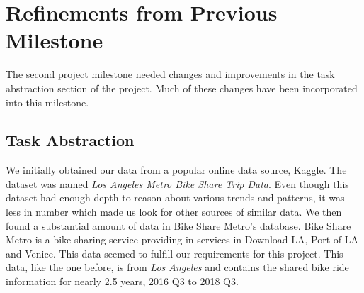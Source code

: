 \section{Refinements from Previous Milestone} 
\label{sec:research}

The second project milestone needed changes and improvements in the task abstraction section of the project. Much of these changes have been incorporated into this milestone. 

\subsection{Task Abstraction}
\label{sec:task abstraction}

We initially obtained our data from a popular online data source, Kaggle. The dataset was named \textit{Los Angeles Metro Bike Share Trip Data}. Even though this dataset had enough depth to reason about various trends and patterns, it was less in number which made us look for other sources of similar data. We then found a substantial amount of data in Bike Share Metro's database. Bike Share Metro is a bike sharing service providing in services in Download LA, Port of LA and Venice. This data seemed to fulfill our requirements for this project. This data, like the one before, is from \textit{Los Angeles} and contains the shared bike ride information for nearly 2.5 years, 2016 Q3 to 2018 Q3. 

